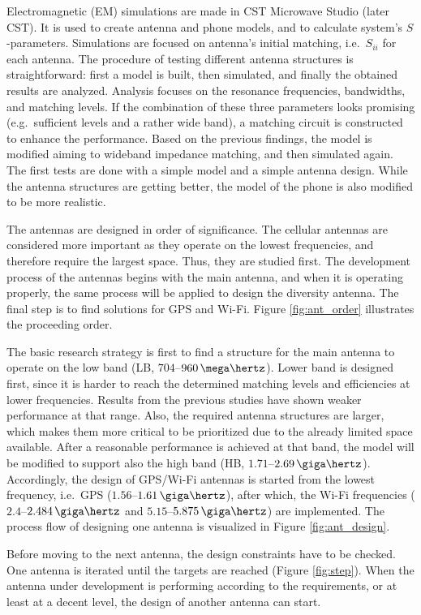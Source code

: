 Electromagnetic (EM) simulations are made in CST Microwave Studio \cite{cst} (later CST). It is used to create antenna and phone models, and to calculate system's $S$-parameters. Simulations are focused on antenna's initial matching, i.e.\ $S_{ii}$ for each antenna. The procedure of testing different antenna structures is straightforward: first a model is built, then simulated, and finally the obtained results are analyzed. Analysis focuses on the resonance frequencies, bandwidths, and matching levels. If the combination of these three parameters looks promising (e.g.\ sufficient levels and a rather wide band), a matching circuit is constructed to enhance the performance. Based on the previous findings, the model is modified aiming to wideband impedance matching, and then simulated again. The first tests are done with a simple model and a simple antenna design. While the antenna structures are getting better, the model of the phone is also modified to be more realistic.

The antennas are designed in order of significance. The cellular antennas are considered more important as they operate on the lowest frequencies, and therefore require the largest space. Thus, they are studied first. The development process of the antennas begins with the main antenna, and when it is operating properly, the same process will be applied to design the diversity antenna. The final step is to find solutions for GPS and Wi-Fi. Figure \ref{fig:ant_order} illustrates the proceeding order. 

The basic research strategy is first to find a structure for the main antenna to operate on the low band (LB, $704$--$960\,\mega\hertz$). Lower band is designed first, since it is harder to reach the determined matching levels and efficiencies at lower frequencies. Results from the previous studies have shown weaker performance at that range. Also, the required antenna structures are larger, which makes them more critical to be prioritized due to the already limited space available. After a reasonable performance is achieved at that band, the model will be modified to support also the high band (HB, $1.71$--$2.69\,\giga\hertz$). Accordingly, the design of GPS/Wi-Fi antennas is started from the lowest frequency, i.e.\ GPS ($1.56$--$1.61\,\giga\hertz$), after which, the Wi-Fi frequencies ($2.4$--$2.484\,\giga\hertz$ and $5.15$--$5.875\,\giga\hertz$) are implemented. The process flow of designing one antenna is visualized in Figure \ref{fig:ant_design}.

Before moving to the next antenna, the design constraints have to be checked. One antenna is iterated until the targets are reached (Figure \ref{fig:step}). When the antenna under development is performing according to the requirements, or at least at a decent level, the design of another antenna can start.

